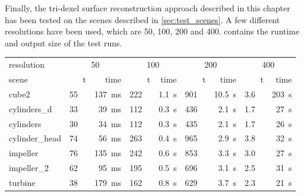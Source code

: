 Finally, the tri-dexel surface reconstruction approach described in this chapter has been tested on the scenes described in \cref{sec:test_scenes}.
A few different resolutions have been used, which are 50, 100, 200 and 400.
 contains the runtime and output size of the test runs.
%
\begin{table}
	\begin{subtable}{\textwidth}
		\centering
		\begin{tabular}{l|rr|rr|rr|rr}
			resolution     & \multicolumn{2}{c}{50} & \multicolumn{2}{c}{100} & \multicolumn{2}{c}{200} & \multicolumn{2}{c}{400} \\
			scene          & t\sub{out} & time & t\sub{out} & time & t\sub{out} & time & t\sub{out} & time \\
			\midrule
			cube2          & \SI{55}{\kilo\nothing} & \SI{137}{\milli\second} & \SI{222}{\kilo\nothing} & \SI{1.1}{\second} & \SI{901}{\kilo\nothing} & \SI{10.5}{\second} & \SI{3.6}{\mega\nothing} & \SI{203}{\second} \\
			cylinders\_d   & \SI{33}{\kilo\nothing} & \SI{ 39}{\milli\second} & \SI{112}{\kilo\nothing} & \SI{0.3}{\second} & \SI{436}{\kilo\nothing} & \SI{ 2.1}{\second} & \SI{1.7}{\mega\nothing} & \SI{ 27}{\second} \\
			cylinders      & \SI{30}{\kilo\nothing} & \SI{ 34}{\milli\second} & \SI{112}{\kilo\nothing} & \SI{0.3}{\second} & \SI{435}{\kilo\nothing} & \SI{ 2.1}{\second} & \SI{1.7}{\mega\nothing} & \SI{ 26}{\second} \\
			cylinder\_head & \SI{74}{\kilo\nothing} & \SI{ 56}{\milli\second} & \SI{263}{\kilo\nothing} & \SI{0.4}{\second} & \SI{965}{\kilo\nothing} & \SI{ 2.9}{\second} & \SI{3.8}{\mega\nothing} & \SI{ 32}{\second} \\
			impeller       & \SI{76}{\kilo\nothing} & \SI{135}{\milli\second} & \SI{242}{\kilo\nothing} & \SI{0.6}{\second} & \SI{853}{\kilo\nothing} & \SI{ 3.3}{\second} & \SI{3.0}{\mega\nothing} & \SI{ 27}{\second} \\
			impeller\_2    & \SI{62}{\kilo\nothing} & \SI{ 95}{\milli\second} & \SI{195}{\kilo\nothing} & \SI{0.5}{\second} & \SI{696}{\kilo\nothing} & \SI{ 3.1}{\second} & \SI{2.5}{\mega\nothing} & \SI{ 31}{\second} \\
			turbine        & \SI{38}{\kilo\nothing} & \SI{179}{\milli\second} & \SI{162}{\kilo\nothing} & \SI{0.8}{\second} & \SI{629}{\kilo\nothing} & \SI{ 3.7}{\second} & \SI{2.3}{\mega\nothing} & \SI{ 21}{\second} \\
		\end{tabular}

\end{subtable}
\end{table}
